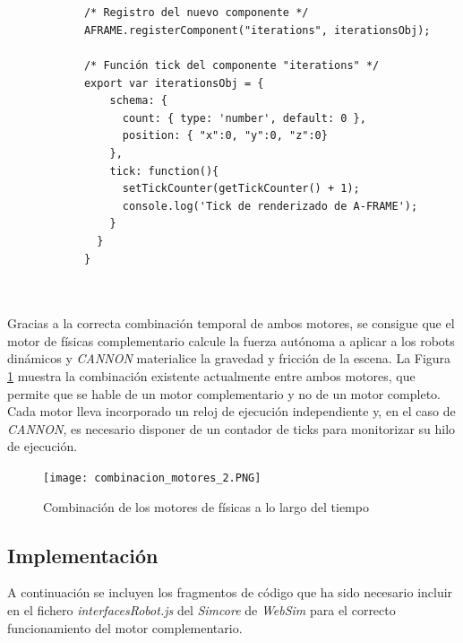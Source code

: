 \small {
\begin{verbatim}


            /* Registro del nuevo componente */
            AFRAME.registerComponent("iterations", iterationsObj);
            
            /* Función tick del componente "iterations" */
            export var iterationsObj = {
                schema: {
                  count: { type: 'number', default: 0 },
                  position: { "x":0, "y":0, "z":0}
                },
                tick: function(){
                  setTickCounter(getTickCounter() + 1);
                  console.log('Tick de renderizado de A-FRAME');
                }
              }
            }
            
            
\end{verbatim}
}

\normalsize
Gracias a la correcta combinación temporal de ambos motores, se consigue que el motor de físicas complementario calcule la fuerza autónoma a aplicar a los robots dinámicos y \textit{CANNON} materialice la gravedad y fricción de la escena. La Figura \ref{fig:combi_motor} muestra la combinación existente actualmente entre ambos motores, que permite que se hable de un motor complementario y no de un motor completo. Cada motor lleva incorporado un reloj de ejecución independiente y, en el caso de \textit{CANNON}, es necesario disponer de un contador de ticks para monitorizar su hilo de ejecución.

\clearpage
\begin{figure}[h!]
    \centering
    \texttt{[image: combinacion\_motores\_2.PNG]}
    \caption[Combinación de los motores de físicas a lo largo del tiempo]{Combinación de los motores de físicas a lo largo del tiempo\footnotemark}
    \label{fig:combi_motor}
\end{figure}

\subsection{Implementación}
A continuación se incluyen los fragmentos de código que ha sido necesario incluir en el fichero \textit{interfacesRobot.js} del \textit{Simcore} de \textit{WebSim} para el correcto funcionamiento del motor complementario. \newline

